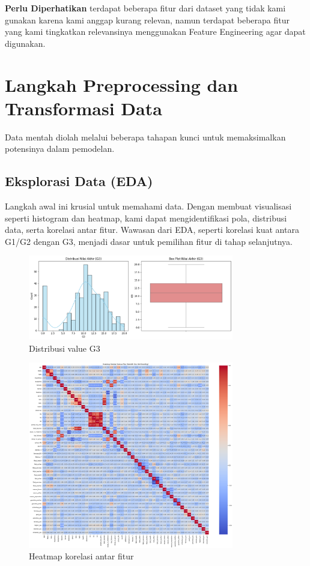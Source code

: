  \item \textbf{Perlu Diperhatikan} terdapat beberapa fitur dari dataset yang tidak kami gunakan karena kami anggap kurang relevan, namun terdapat beberapa fitur yang kami tingkatkan relevansinya menggunakan Feature Engineering agar dapat digunakan. 


\section{Langkah Preprocessing dan Transformasi Data}
Data mentah diolah melalui beberapa tahapan kunci untuk memaksimalkan potensinya dalam pemodelan.

\subsection{Eksplorasi Data (EDA)}
Langkah awal ini krusial untuk memahami data. Dengan membuat visualisasi seperti histogram dan heatmap, kami dapat mengidentifikasi pola, distribusi data, serta korelasi antar fitur. Wawasan dari EDA, seperti korelasi kuat antara G1/G2 dengan G3, menjadi dasar untuk pemilihan fitur di tahap selanjutnya.
\begin{figure}[h!]
    \centering
    \includegraphics[width=0.8\textwidth]{images/G3Dist.png}
    \caption{Distribusi value G3}
\end{figure}
\begin{figure}[h!]
    \centering
    \includegraphics[width=0.8\textwidth]{images/Heatmap.png}
    \caption{Heatmap korelasi antar fitur}
\end{figure}

